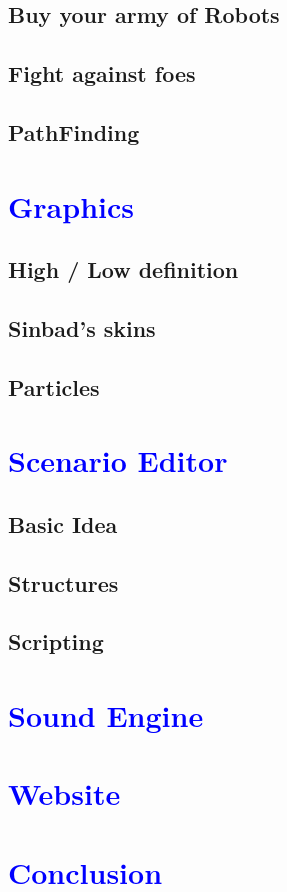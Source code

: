 \documentclass[article]{report}         %
\begin{document}
      \section{Buy your army of Robots}
      \section{Fight against foes}
      \section{PathFinding}
    \chapter{\textcolor{blue}{Graphics}}
      \section{High / Low definition}
      \section{Sinbad's skins}
      \section{Particles}
    \chapter{\textcolor{blue}{Scenario Editor}}
      \section{Basic Idea}
      \section{Structures}
      \section{Scripting}
    \chapter{\textcolor{blue}{Sound Engine}}
    \chapter{\textcolor{blue}{Website}}
    \chapter{\textcolor{blue}{Conclusion}}
    
\end{document}
